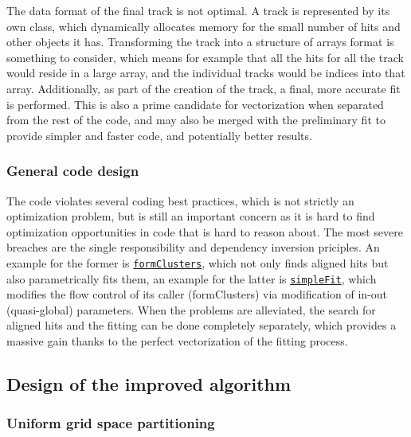 \documentclass[12pt]{article}
\newcommand{\code}[1]{\texttt{#1}}
\begin{document}
The data format of the final track is not optimal. A track is represented by its own class, which dynamically allocates memory for the small number of hits and other objects it has. Transforming the track into a structure of arrays format is something to consider, which means for example that all the hits for all the track would reside in a large array, and the individual tracks would be indices into that array.
Additionally, as part of the creation of the track, a final, more accurate fit is performed. This is also a prime candidate for vectorization when separated from the rest of the code, and may also be merged with the preliminary fit to provide simpler and faster code, and potentially better results.


\subsubsection{General code design}

The code violates several coding best practices, which is not strictly an optimization problem, but is still an important concern as it is hard to find optimization opportunities in code that is hard to reason about. The most severe breaches are the single responsibility and dependency inversion priciples. An example for the former is \href{https://gitlab.cern.ch/lhcb/Rec/blob/1b7edc5aea96f2225601238b3f64e478e41b6c70/Pr/PrVeloUT/src/PrVeloUT.cpp#L337}{\code{formClusters}}, which not only finds aligned hits but also parametrically fits them, an example for the latter is \href{https://gitlab.cern.ch/lhcb/Rec/blob/1b7edc5aea96f2225601238b3f64e478e41b6c70/Pr/PrVeloUT/src/PrVeloUT.h#L191}{\code{simpleFit}}, which modifies the flow control of its caller (formClusters) via modification of in-out (quasi-global) parameters. When the problems are alleviated, the search for aligned hits and the fitting can be done completely separately, which provides a massive gain thanks to the perfect vectorization of the fitting process.


\subsection{Design of the improved algorithm}

\subsubsection{Uniform grid space partitioning}\label{sec_velout_space_partitioning}
\end{document}
